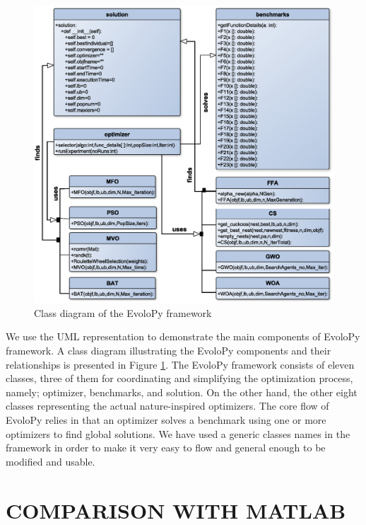 \documentclass[a4paper,twoside]{article}
\begin{document}
\begin{figure}[http]
\centerline{\includegraphics[scale=0.52]{classD.eps}}
\caption{Class diagram of the EvoloPy framework}
\label{fig:framework}
\end{figure}

We use the UML representation to demonstrate the main components of EvoloPy framework. A class diagram illustrating the EvoloPy components and their relationships is presented in Figure \ref{fig:framework}. The EvoloPy framework consists of eleven classes, three of them for coordinating and simplifying the optimization process, namely; optimizer, benchmarks, and solution. On the other hand, the other eight classes representing the actual nature-inspired optimizers. The core flow of EvoloPy relies in that an optimizer solves a benchmark using one or more optimizers to find global solutions. We have used a generic classes names in the framework in order to make it very easy to flow and general enough to be modified and usable.





\section{\uppercase{Comparison with Matlab}}
\end{document}

